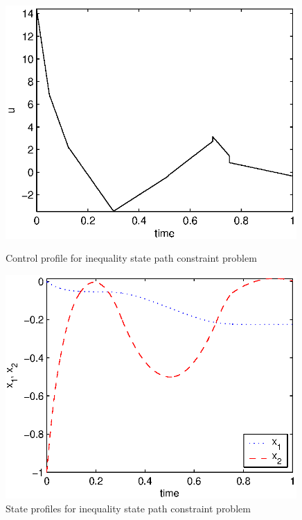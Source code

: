 \begin{figure}[htb]
\begin{minipage}[t]{0.5\linewidth}
\centering
\includegraphics[width=0.99\textwidth]{examples/problem3/graphs/u_627a.eps}
\caption[Tutorial example 4: control profile]{Control profile for
  inequality state path constraint problem} \label{fig:prob3_u}
\end{minipage}
\begin{minipage}[t]{0.5\linewidth}
\centering
\includegraphics[width=0.99\textwidth]{examples/problem3/graphs/x12_627a.eps}
\caption[Tutorial example 4: state profiles]{State profiles for
  inequality state path constraint problem} \label{fig:prob3_x}

\end{minipage}
\end{figure}
